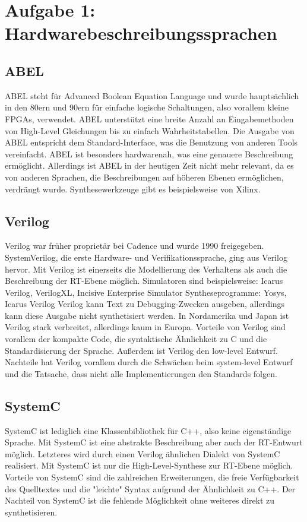 \documentclass[parskip=full]{scrartcl}
\begin{document}
	\setcounter{section}{1}
	\section*{Aufgabe 1: Hardwarebeschreibungssprachen}
		\subsection{ABEL}
			ABEL steht für Advanced Boolean Equation Language und wurde hauptsächlich in den 80ern und 90ern für einfache logische Schaltungen, also vorallem kleine FPGAs, verwendet. ABEL unterstützt eine breite Anzahl an Eingabemethoden von High-Level Gleichungen bis zu einfach Wahrheitstabellen. 
			Die Ausgabe von ABEL entspricht dem Standard-Interface, was die Benutzung von anderen Tools vereinfacht. ABEL ist besonders hardwarenah, was eine genauere Beschreibung ermöglicht.
			Allerdings ist ABEL in der heutigen Zeit nicht mehr relevant, da es von anderen Sprachen, die Beschreibungen auf höheren Ebenen ermöglichen, verdrängt wurde.
			Synthesewerkzeuge gibt es beispielsweise von Xilinx.
			
		\subsection{Verilog}
			Verilog war früher proprietär bei Cadence und wurde 1990 freigegeben. SystemVerilog, die erste Hardware- und Verifikationssprache, ging aus Verilog hervor. Mit Verilog ist einerseits die Modellierung des Verhaltens als auch die Beschreibung der RT-Ebene möglich.
			Simulatoren sind beispielsweise: Icarus Verilog, VerilogXL, Incisive Enterprise Simulator
			Syntheseprogramme: Yosys, Icarus Verilog
			Verilog kann Text zu Debugging-Zwecken ausgeben, allerdings kann diese Ausgabe nicht synthetisiert werden. In Nordamerika und Japan ist Verilog stark verbreitet, allerdings kaum in Europa.
			Vorteile von Verilog sind vorallem der kompakte Code, die syntaktische Ähnlichkeit zu C und die Standardisierung der Sprache. Außerdem ist Verilog den low-level Entwurf.
			Nachteile hat Verilog vorallem durch die Schwächen beim system-level Entwurf und die Tatsache, dass nicht alle Implementierungen den Standards folgen.
		
		\subsection{SystemC}
			SystemC ist lediglich eine Klassenbibliothek für C++, also keine eigenständige Sprache. Mit SystemC ist eine abstrakte Beschreibung aber auch der RT-Entwurt möglich. Letzteres wird durch einen Verilog ähnlichen Dialekt von SystemC realisiert. Mit SystemC ist nur die High-Level-Synthese zur RT-Ebene möglich.
			Vorteile von SystemC sind die zahlreichen Erweiterungen, die freie Verfügbarkeit des Quelltextes und die "leichte" Syntax aufgrund der Ähnlichkeit zu C++.
			Der Nachteil von SystemC ist die fehlende Möglichkeit ohne weiteres direkt zu synthetisieren.
		
\end{document}
